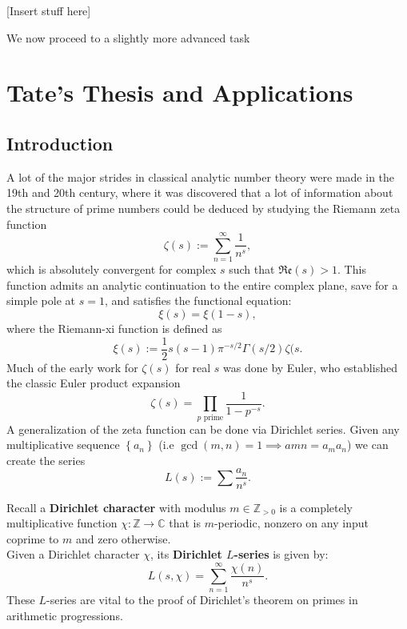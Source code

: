 \documentclass[11pt, x11names]{article}
\newcommand{\zz}{\mathbb{Z}}
\newcommand{\cc}{\mathbb{C}}
\newcommand{\set}[1]{\left\{ #1 \right\}}
\newcommand{\re}[1]{\mathfrak{Re} \left( #1 \right)}
\begin{document}
[Insert stuff here]

We now proceed to a slightly more advanced task


\newpage
\section{Tate's Thesis and Applications}
\label{section: Tate's Thesis and Applications}

\subsection*{Introduction}
A lot of the major strides in classical analytic number theory were made in the 19th and 20th century, where it was discovered that a lot of information about the structure of prime numbers could be deduced by studying the Riemann zeta function
\begin{equation*}
    \zeta(s) := \sum^\infty_{n=1} \frac{1}{n^s},
\end{equation*}
which is absolutely convergent for complex $s$ such that $\re{s} > 1$. This function admits an analytic continuation to the entire complex plane, save for a simple pole at $s=1$, and satisfies the functional equation:
\begin{equation*}
    \xi(s) = \xi(1-s),
\end{equation*}
where the Riemann-xi function is defined as
\begin{equation*}
    \xi(s) := \frac{1}{2}s(s-1)\pi^{-s/2} \Gamma(s/2) \zeta(s.
\end{equation*}
Much of the early work for $\zeta(s)$ for real $s$ was done by Euler, who established the classic Euler product expansion
\begin{equation*}
    \zeta(s) = \prod_{p \text{ prime}} \frac{1}{1-p^{-s}}.
\end{equation*}
A generalization of the zeta function can be done via Dirichlet series. Given any multiplicative sequence $\set{a_n}$ (i.e $\gcd(m, n) = 1 \implies a{mn} = a_ma_n$) we can create the series 
\begin{equation*}
    L(s) := \sum \frac{a_n}{n^s}.
\end{equation*}

\begin{example}
\label{example: Dirichlet L-func}
    Recall a \textbf{Dirichlet character} with modulus $m \in \zz_{> 0}$ is a completely multiplicative function $\chi: \zz \to \cc$ that is $m$-periodic, nonzero on any input coprime to $m$ and zero otherwise.\\
    Given a Dirichlet character $\chi$, its \textbf{Dirichlet $L$-series} is given by:
    \begin{equation*}
        L(s, \chi) = \sum^\infty_{n=1} \frac{\chi(n)}{n^s}.
    \end{equation*}
    These $L$-series are vital to the proof of Dirichlet's theorem on primes in arithmetic progressions.
\end{example}
\end{document}
